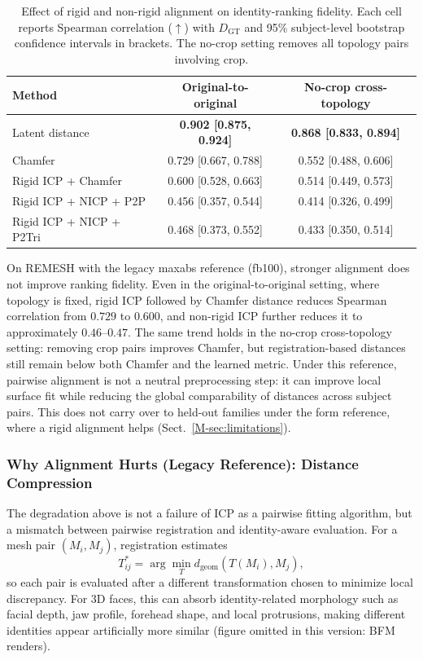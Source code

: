 \begin{table}[!ht]
\centering
\small
\caption{Effect of rigid and non-rigid alignment on identity-ranking fidelity.
Each cell reports Spearman correlation ($\uparrow$) with $D_{\mathrm{GT}}$ and
95\% subject-level bootstrap confidence intervals in brackets. The no-crop
setting removes all topology pairs involving crop.}
\label{tab:alignment_effect}
\begin{tabular}{lcc}
\toprule
Method & Original-to-original & No-crop cross-topology \\
\midrule
Latent distance & \textbf{0.902 [0.875, 0.924]} & \textbf{0.868 [0.833, 0.894]} \\
Chamfer & 0.729 [0.667, 0.788] & 0.552 [0.488, 0.606] \\
Rigid ICP + Chamfer & 0.600 [0.528, 0.663] & 0.514 [0.449, 0.573] \\
Rigid ICP + NICP + P2P & 0.456 [0.357, 0.544] & 0.414 [0.326, 0.499] \\
Rigid ICP + NICP + P2Tri & 0.468 [0.373, 0.552] & 0.433 [0.350, 0.514] \\
\bottomrule
\end{tabular}
\end{table}

On REMESH with the legacy maxabs reference (fb100), stronger alignment does not improve ranking fidelity. Even in the original-to-original setting, where topology is fixed, rigid ICP followed by Chamfer distance reduces Spearman correlation from $0.729$ to $0.600$, and non-rigid ICP further reduces it to approximately $0.46$--$0.47$. The same trend holds in the no-crop cross-topology setting: removing crop pairs improves Chamfer, but registration-based distances still remain below both Chamfer and the learned metric. Under this reference, pairwise alignment is not a neutral preprocessing step: it can improve local surface fit while reducing the global comparability of distances across subject pairs. This does not carry over to held-out families under the form reference, where a rigid alignment helps (Sect.~\ref{M-sec:limitations}).


\subsubsection{Why Alignment Hurts (Legacy Reference): Distance Compression}
\label{sec:distance_compression}
The degradation above is not a failure of ICP as a pairwise fitting algorithm,
but a mismatch between pairwise registration and identity-aware evaluation. For a
mesh pair $(M_i,M_j)$, registration estimates
\begin{equation}
T_{ij}^{*}=\arg\min_T d_{\mathrm{geom}}(T(M_i),M_j),
\end{equation}
so each pair is evaluated after a different transformation chosen to minimize
local discrepancy. For 3D faces, this can absorb identity-related morphology
such as facial depth, jaw profile, forehead shape, and local protrusions, making
different identities appear artificially more similar
(figure omitted in this version: BFM renders).

